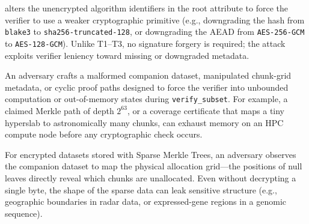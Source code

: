 \documentclass[11pt]{article}
\begin{document}
\begin{description}[nosep]
    alters the unencrypted algorithm identifiers in the root attribute to
    force the verifier to use a weaker cryptographic primitive (e.g.,
    downgrading the hash from \texttt{blake3} to \texttt{sha256-truncated-128}, or
    downgrading the AEAD from \texttt{AES-256-GCM} to \texttt{AES-128-GCM}).
    Unlike T1--T3, no signature forgery is required; the attack exploits
    verifier leniency toward missing or downgraded metadata.
  \item[T7: Verification resource exhaustion (DoS).]
    An adversary crafts a malformed companion dataset, manipulated
    chunk-grid metadata, or cyclic proof paths designed to force the
    verifier into unbounded computation or out-of-memory states during
    \texttt{verify\_subset}.  For example, a claimed Merkle path of
    depth $2^{63}$, or a coverage certificate that maps a tiny hyperslab
    to astronomically many chunks, can exhaust memory on an HPC compute
    node before any cryptographic check occurs.
  \item[T8: Structural metadata leakage (privacy).]
    For encrypted datasets stored with Sparse Merkle Trees, an adversary
    observes the companion dataset to map the physical allocation grid---the
    positions of null leaves directly reveal which chunks are unallocated.
    Even without decrypting a single byte, the shape of the sparse data
    can leak sensitive structure (e.g., geographic boundaries in radar data,
    or expressed-gene regions in a genomic sequence).
\end{description}
\end{document}
